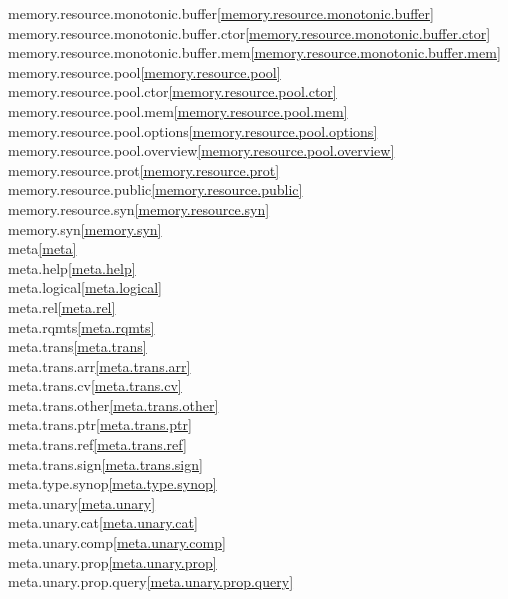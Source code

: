 \begin{multicols}{2}
memory.resource.monotonic.buffer\quad\ref{memory.resource.monotonic.buffer}\\
memory.resource.monotonic.buffer.ctor\quad\ref{memory.resource.monotonic.buffer.ctor}\\
memory.resource.monotonic.buffer.mem\quad\ref{memory.resource.monotonic.buffer.mem}\\
memory.resource.pool\quad\ref{memory.resource.pool}\\
memory.resource.pool.ctor\quad\ref{memory.resource.pool.ctor}\\
memory.resource.pool.mem\quad\ref{memory.resource.pool.mem}\\
memory.resource.pool.options\quad\ref{memory.resource.pool.options}\\
memory.resource.pool.overview\quad\ref{memory.resource.pool.overview}\\
memory.resource.prot\quad\ref{memory.resource.prot}\\
memory.resource.public\quad\ref{memory.resource.public}\\
memory.resource.syn\quad\ref{memory.resource.syn}\\
memory.syn\quad\ref{memory.syn}\\
meta\quad\ref{meta}\\
meta.help\quad\ref{meta.help}\\
meta.logical\quad\ref{meta.logical}\\
meta.rel\quad\ref{meta.rel}\\
meta.rqmts\quad\ref{meta.rqmts}\\
meta.trans\quad\ref{meta.trans}\\
meta.trans.arr\quad\ref{meta.trans.arr}\\
meta.trans.cv\quad\ref{meta.trans.cv}\\
meta.trans.other\quad\ref{meta.trans.other}\\
meta.trans.ptr\quad\ref{meta.trans.ptr}\\
meta.trans.ref\quad\ref{meta.trans.ref}\\
meta.trans.sign\quad\ref{meta.trans.sign}\\
meta.type.synop\quad\ref{meta.type.synop}\\
meta.unary\quad\ref{meta.unary}\\
meta.unary.cat\quad\ref{meta.unary.cat}\\
meta.unary.comp\quad\ref{meta.unary.comp}\\
meta.unary.prop\quad\ref{meta.unary.prop}\\
meta.unary.prop.query\quad\ref{meta.unary.prop.query}\\

\end{multicols}
